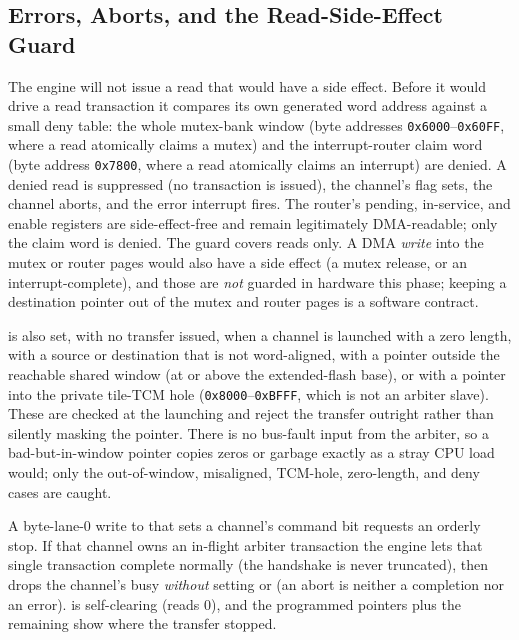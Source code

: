 \subsection{Errors, Aborts, and the Read-Side-Effect Guard}

The engine will not issue a read that would have a side effect. Before it would drive a read transaction it compares its own generated word address against a small deny table: the whole mutex-bank window (byte addresses \texttt{0x6000}--\texttt{0x60FF}, where a read atomically claims a mutex) and the interrupt-router claim word (byte address \texttt{0x7800}, where a read atomically claims an interrupt) are denied. A denied read is suppressed (no transaction is issued), the channel's  flag sets, the channel aborts, and the error interrupt fires. The router's pending, in-service, and enable registers are side-effect-free and remain legitimately DMA-readable; only the claim word is denied. The guard covers reads only. A DMA \emph{write} into the mutex or router pages would also have a side effect (a mutex release, or an interrupt-complete), and those are \emph{not} guarded in hardware this phase; keeping a destination pointer out of the mutex and router pages is a software contract.

 is also set, with no transfer issued, when a channel is launched with a zero length, with a source or destination that is not word-aligned, with a pointer outside the reachable shared window (at or above the extended-flash base), or with a pointer into the private tile-TCM hole (\texttt{0x8000}--\texttt{0xBFFF}, which is not an arbiter slave). These are checked at the launching  and reject the transfer outright rather than silently masking the pointer. There is no bus-fault input from the arbiter, so a bad-but-in-window pointer copies zeros or garbage exactly as a stray CPU load would; only the out-of-window, misaligned, TCM-hole, zero-length, and deny cases are caught.

A byte-lane-0 write to  that sets a channel's  command bit requests an orderly stop. If that channel owns an in-flight arbiter transaction the engine lets that single transaction complete normally (the handshake is never truncated), then drops the channel's busy \emph{without} setting  or  (an abort is neither a completion nor an error).  is self-clearing (reads 0), and the programmed pointers plus the remaining  show where the transfer stopped.


